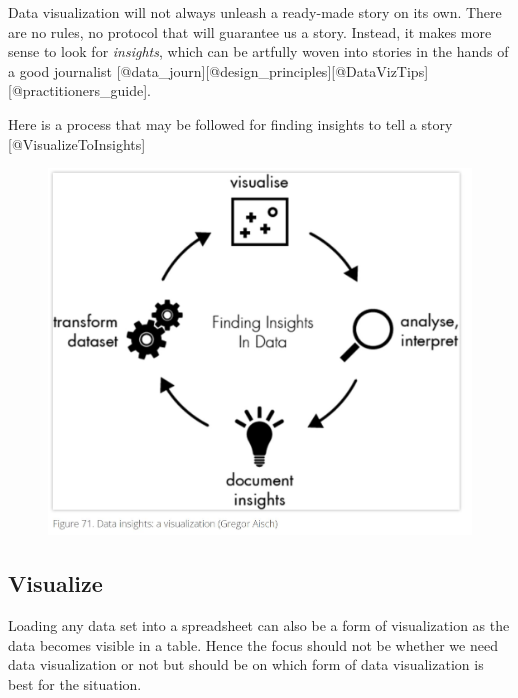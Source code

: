 \documentclass[]{book}
\theoremstyle{definition}
\theoremstyle{definition}
\theoremstyle{definition}
\theoremstyle{remark}
\begin{document}
Data visualization will not always unleash a ready-made story on its
own. There are no rules, no protocol that will guarantee us a story.
Instead, it makes more sense to look for \emph{insights}, which can be
artfully woven into stories in the hands of a good journalist
{[}@data\_journ{]}{[}@design\_principles{]}{[}@DataVizTips{]}{[}@practitioners\_guide{]}.

Here is a process that may be followed for finding insights to tell a
story {[}@VisualizeToInsights{]}

\begin{figure}
\centering
\includegraphics{images/DataInsights.JPG}
\caption{}
\end{figure}

\subsection{Visualize}\label{visualize}

Loading any data set into a spreadsheet can also be a form of
visualization as the data becomes visible in a table. Hence the focus
should not be whether we need data visualization or not but should be on
which form of data visualization is best for the situation.
\end{document}
